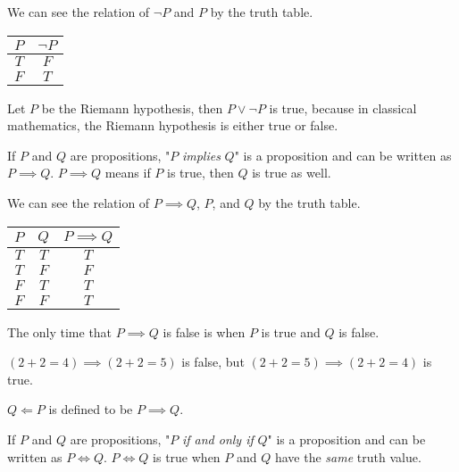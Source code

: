 \documentclass[a4paper]{article}
\begin{document}
We can see the relation of $\neg P$ and $P$ by the truth table.

\begin{center}
	\begin{tabular}{|c|c|}
		\hline
		$P$ & $\neg P$\\
		\hline
		$T$ & $F$\\
		\hline
		$F$ & $T$\\
		\hline
	\end{tabular}
\end{center}

\begin{eg}
Let $P$ be the Riemann hypothesis, then $P \lor \neg P$ is true, because in classical mathematics, the Riemann hypothesis is either true or false.
\end{eg}

\begin{defi}[Implies]
If $P$ and $Q$ are propositions, "$P$ \emph{implies} $Q$" is a proposition and can be written as $P \implies Q$. $P \implies Q$ means if $P$ is true, then $Q$ is true as well.
\end{defi}

We can see the relation of $P \implies Q$, $P$, and $Q$ by the truth table.

\begin{center}
	\begin{tabular}{|c|c|c|}
		\hline
		$P$ & $Q$ & $P \implies Q$\\
		\hline
		$T$ & $T$ & $T$\\
		\hline
		$T$ & $F$ & $F$\\
		\hline
		$F$ & $T$ & $T$\\
		\hline
		$F$ & $F$ & $T$\\
		\hline
	\end{tabular}
\end{center}

The only time that $P \implies Q$ is false is when $P$ is true and $Q$ is false.

\begin{eg}
$(2 + 2 = 4) \implies (2 + 2 = 5)$ is false, but $(2 + 2 = 5) \implies (2 + 2 = 4)$ is true.
\end{eg}

\begin{notation}
$Q \Longleftarrow P$ is defined to be $P \implies Q$.
\end{notation}

\begin{defi}
If $P$ and $Q$ are propositions, "$P$ \emph{if and only if} $Q$" is a proposition and can be written as $P \iff Q$. $P \iff Q$ is true when $P$ and $Q$ have the \emph{same} truth value.
\end{defi}
\end{document}
